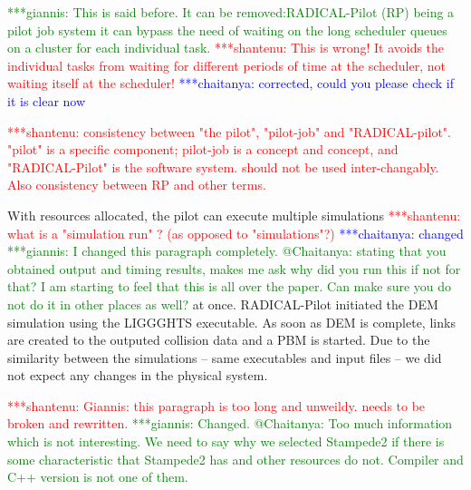 \documentclass[preprint,11pt,authoryear]{elsarticle}
\newcommand{\jhanote}[1]{ {\textcolor{red} { ***shantenu: #1 }}}
\newcommand{\csnote}[1]{ {\textcolor{blue} { ***chaitanya: #1 }}}
\newcommand{\gpnote}[1]{{\textcolor{green} {***giannis: #1}}}
\newcommand{\jhanote}[1]{ {\textcolor{red} { ***shantenu: #1 }}}
\newcommand{\csnote}[1]{}
\newcommand{\gpnote}[1]{}
\begin{document}
\gpnote{This is said before. It can be removed:RADICAL-Pilot (RP) being a pilot job system it can bypass the need of
waiting on the long scheduler queues on a cluster for each individual task.} \jhanote{This is wrong! It
avoids the individual tasks from waiting for different periods of time at the
scheduler, not waiting itself at the scheduler!} \csnote{corrected, could you please check if it is clear now} 

\jhanote{consistency between
"the pilot", "pilot-job" and "RADICAL-pilot". "pilot" is a specific component; pilot-job is a  concept and concept, and "RADICAL-Pilot" is the software system. should not be used inter-changably. Also consistency between RP and other terms.} 

With resources allocated, the pilot can execute multiple simulations
\jhanote{what is a "simulation run" ? (as opposed to "simulations"?)}\csnote{changed}\gpnote{I changed
	this paragraph completely. @Chaitanya: stating that you obtained output and timing results, makes me
	ask why did you run this if not for that? I am starting to feel that this is all over the paper. Can
make sure you do not do it in other places as well?}
at once.
RADICAL-Pilot initiated the DEM simulation using the LIGGGHTS executable. As soon
as DEM is complete, links are created to the outputed collision data and a PBM
is started. Due to the similarity between the simulations -- same executables and
input files -- we did not expect any changes in the physical system. 



\jhanote{Giannis: this paragraph is too long and unweildy. needs to be broken and rewritten.}\gpnote{Changed.
	@Chaitanya: Too much information which is not interesting. We need to say why we selected Stampede2 if there
is some characteristic that Stampede2 has and other resources do not. Compiler and C++ version is not one of them.}
\end{document}
